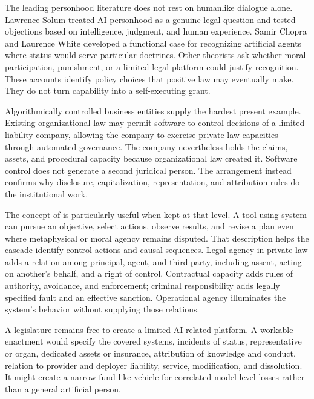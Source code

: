 The leading personhood literature does not rest on humanlike dialogue alone. Lawrence Solum treated AI personhood as a genuine legal question and tested objections based on intelligence, judgment, and human experience. Samir Chopra and Laurence White developed a functional case for recognizing artificial agents where status would serve particular doctrines. Other theorists ask whether moral participation, punishment, or a limited legal platform could justify recognition. These accounts identify policy choices that positive law may eventually make. They do not turn capability into a self-executing grant.

Algorithmically controlled business entities supply the hardest present example. Existing organizational law may permit software to control decisions of a limited liability company, allowing the company to exercise private-law capacities through automated governance. The company nevertheless holds the claims, assets, and procedural capacity because organizational law created it. Software control does not generate a second juridical person. The arrangement instead confirms why disclosure, capitalization, representation, and attribution rules do the institutional work.

The concept of  is particularly useful when kept at that level. A tool-using system can pursue an objective, select actions, observe results, and revise a plan even where metaphysical or moral agency remains disputed. That description helps the cascade identify control actions and causal sequences. Legal agency in private law adds a relation among principal, agent, and third party, including assent, acting on another's behalf, and a right of control. Contractual capacity adds rules of authority, avoidance, and enforcement; criminal responsibility adds legally specified fault and an effective sanction. Operational agency illuminates the system's behavior without supplying those relations.

A legislature remains free to create a limited AI-related platform. A workable enactment would specify the covered systems, incidents of status, representative or organ, dedicated assets or insurance, attribution of knowledge and conduct, relation to provider and deployer liability, service, modification, and dissolution. It might create a narrow fund-like vehicle for correlated model-level losses rather than a general artificial person.

